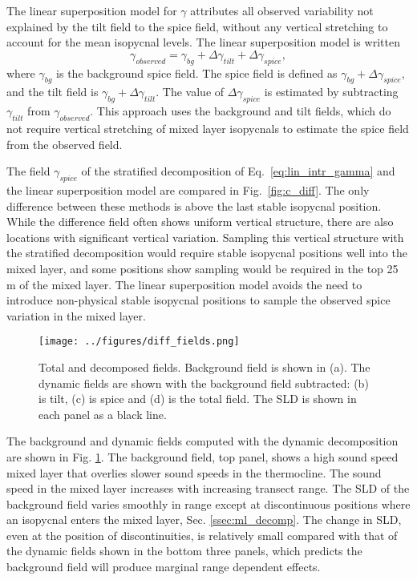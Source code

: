 \documentclass[preprint,NumberedRefs]{JASA}
\begin{document}
The linear superposition model for $\gamma$ attributes all observed variability not explained by the tilt field to the spice field, without any vertical stretching to account for the mean isopycnal levels. The linear superposition model is written
\begin{equation}
    \gamma_{observed} = \gamma_{bg} + \Delta \gamma_{tilt} + \Delta \gamma_{spice},
    \label{eq:lin_sup}
\end{equation}
where $\gamma_{bg}$ is the background spice field. The spice field is defined as $\gamma_{bg} + \Delta \gamma_{spice}$, and the tilt field is $\gamma_{bg} + \Delta \gamma_{tilt}$. The value of $\Delta \gamma_{spice}$ is estimated by subtracting $\gamma_{tilt}$ from $\gamma_{observed}$. This approach uses the background and tilt fields, which do not require vertical stretching of mixed layer isopycnals to estimate the spice field from the observed field.

The field $\gamma_{spice}$ of the stratified decomposition of Eq.~\eqref{eq:lin_intr_gamma} and the linear superposition model are compared in Fig.~\ref{fig:c_diff}. The only difference between these methods is above the last stable isopycnal position. While the difference field often shows uniform vertical structure, there are also locations with significant vertical variation. Sampling this vertical structure with the stratified decomposition would require stable isopycnal positions well into the mixed layer, and some positions show sampling would be required in the top 25 m of the mixed layer. The linear superposition model avoids the need to introduce non-physical stable isopycnal positions to sample the observed spice variation in the mixed layer.

\begin{figure}
\texttt{[image: ../figures/diff\_fields.png]}
        \caption{\label{fig:c_fields}{Total and decomposed fields. Background field is shown in (a). The dynamic fields are shown with the background field subtracted: (b) is tilt, (c) is spice and (d) is the total field. The SLD is shown in each panel as a black line.}}
\end{figure}

The background and dynamic fields computed with the dynamic decomposition are shown in Fig. \ref{fig:c_fields}. The background field, top panel, shows a high sound speed mixed layer that overlies slower sound speeds in the thermocline. The sound speed in the mixed layer increases with increasing transect range. The SLD of the background field varies smoothly in range except at discontinuous positions where an isopycnal enters the mixed layer, Sec. \ref{ssec:ml_decomp}. The change in SLD, even at the position of discontinuities, is relatively small compared with that of the dynamic fields shown in the bottom three panels, which predicts the background field will produce marginal range dependent effects.
\end{document}
